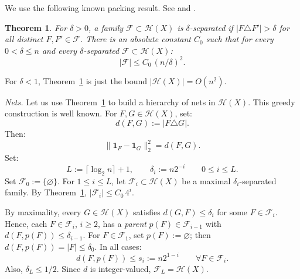 \documentclass[12pt,reqno]{amsart}
\def\le{\leqslant}
\def\ge{\geqslant}\def\geq{\geqslant}
\def\le{\leqslant}
\newtheorem{theorem}{Theorem}[section]
\theoremstyle{remark}
\numberwithin{equation}{section}
\newcommand{\one}{\mathbf{1}}
\begin{document}
We use the following known packing result. See \cite[\S\,5.3]{Mat} 
and \cite{ChazWelzl}.
\begin{theorem}\label{thm:packing}
For \(\delta>0\), a family \(\mathcal F\subset\mathcal H(X)\) is \emph{\(\delta\)-separated} if \(|F\triangle F'|>\delta\) for all distinct \(F,F'\in\mathcal F\). There is an absolute constant \(C_0\) such that for every \(0<\delta\le n\) and every \(\delta\)-separated \(\mathcal F\subset\mathcal H(X)\):
\[
|\mathcal F|\le C_0\,(n/\delta)^2.
\]
\end{theorem}
For \(\delta<1\), Theorem~\ref{thm:packing} is just the bound \(|\mathcal H(X)|=O(n^2)\).
\smallskip%

\emph{Nets.} Let us use Theorem~\ref{thm:packing} to build a hierarchy of nets in \(\mathcal H(X)\). This greedy construction is well 
known. For \(F,G\in\mathcal H(X)\), set:
\[
d(F,G):=|F\triangle G|.
\]
Then:
\[
\|\one_F-\one_G\|_2^2=d(F,G).
\]
Set:
\[
L:=\lceil\log_2n\rceil+1,\qquad
\delta_i:=n2^{-i}\qquad 0\le i\le L.
\]
Set \(\mathcal F_0:=\{\varnothing\}\). For \(1\le i\le L\), let \(\mathcal F_i\subset\mathcal H(X)\) be a maximal \(\delta_i\)-separated family. By Theorem~\ref{thm:packing}, \(|\mathcal F_i|\le C_0\,4^i\).
\smallskip%

By maximality, every \(G\in\mathcal H(X)\) satisfies \(d(G,F)\le\delta_i\) for some \(F\in\mathcal F_i\). Hence, each \(F\in\mathcal F_i\), \(i\ge2\), has a \emph{parent} \(p(F)\in\mathcal F_{i-1}\) with \(d(F,p(F))\le\delta_{i-1}\). For \(F\in\mathcal F_1\), set \(p(F):=\varnothing\); then \(d(F,p(F))=|F|\le\delta_0\). In all cases:
\[
d(F,p(F))\le s_i:=n2^{1-i}\qquad   \forall F\in\mathcal F_i.
\]
Also, \(\delta_L\le1/2\). Since 
\(d\) is integer-valued, \(\mathcal F_L=\mathcal H(X)\).
\smallskip%
\end{document}

